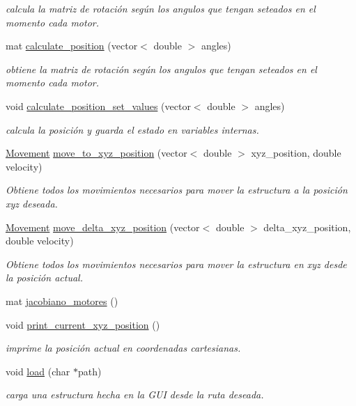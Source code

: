 \begin{DoxyCompactItemize}
\begin{DoxyCompactList}\small\item\em calcula la matriz de rotación según los angulos que tengan seteados en el momento cada motor. \end{DoxyCompactList}\item 
mat \hyperlink{class_motion__structure_abcf3119a5953ab08bf4f5ea1c4716399}{calculate\-\_\-position} (vector$<$ double $>$ angles)
\begin{DoxyCompactList}\small\item\em obtiene la matriz de rotación según los angulos que tengan seteados en el momento cada motor. \end{DoxyCompactList}\item 
void \hyperlink{class_motion__structure_af3914223e9464c84fa894f2674604cff}{calculate\-\_\-position\-\_\-set\-\_\-values} (vector$<$ double $>$ angles)
\begin{DoxyCompactList}\small\item\em calcula la posición y guarda el estado en variables internas. \end{DoxyCompactList}\item 
\hyperlink{class_movement}{Movement} \hyperlink{class_motion__structure_a26174f629c57c614bd5d5f96e8ef32eb}{move\-\_\-to\-\_\-xyz\-\_\-position} (vector$<$ double $>$ xyz\-\_\-position, double velocity)
\begin{DoxyCompactList}\small\item\em Obtiene todos los movimientos necesarios para mover la estructura a la posición xyz deseada. \end{DoxyCompactList}\item 
\hyperlink{class_movement}{Movement} \hyperlink{class_motion__structure_a34d89e582551b6bcc4ba503e96ae1300}{move\-\_\-delta\-\_\-xyz\-\_\-position} (vector$<$ double $>$ delta\-\_\-xyz\-\_\-position, double velocity)
\begin{DoxyCompactList}\small\item\em Obtiene todos los movimientos necesarios para mover la estructura en xyz desde la posición actual. \end{DoxyCompactList}\item 
mat \hyperlink{class_motion__structure_a12a60ceb91c2b6d6c2bca49c9300e34a}{jacobiano\-\_\-motores} ()
\item 
void \hyperlink{class_motion__structure_af8e13d4d457bdb25cd1f954129df7f1c}{print\-\_\-current\-\_\-xyz\-\_\-position} ()
\begin{DoxyCompactList}\small\item\em imprime la posición actual en coordenadas cartesianas. \end{DoxyCompactList}\item 
void \hyperlink{class_motion__structure_a5df5dc494cfd60e8e763e06f7dc5d745}{load} (char $\ast$path)
\begin{DoxyCompactList}\small\item\em carga una estructura hecha en la G\-U\-I desde la ruta deseada. \end{DoxyCompactList}\end{DoxyCompactItemize}


